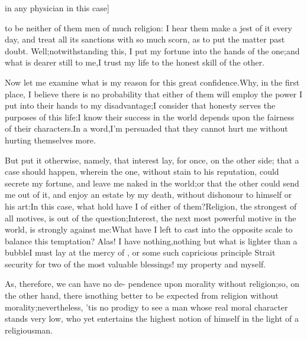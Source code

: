 \documentclass{article}
\begin{document}
\noindent
{}
\stick{“\kern 2pt the physician I usually call in,” [There}
in any physician in this case] 
\begin{story}{to be}
    neither of them men of much
religion: I hear them make a jest of it every day, and treat all
its sanctions with so much scorn, as to put the matter past doubt.
Well;\tsk notwithstanding this, I put my fortune into the hands
of the one;\break\tsk and what is dearer still to me,\pb I trust my life
to the honest skill of the other.
\end{story}
\vspace\parskip
\begin{story}{Now let me examine what is my}
    reason for this great confidence.\tsh\break Why, in the
    first place, I believe there is no probability that either
    of them will employ the power I put into their hands to my
    disadvantage;\tsk I consider that honesty serves the
    purposes of this life:\tsk I know their success in the world
    depends upon the fairness of their characters.\tsh In a
    word,\tsh I’m persuaded that they cannot hurt me without hurting
    themselves more.
\end{story}
\vspace\parskip
\begin{story}{But put it otherwise, namely, that}
    interest lay, for once, on the other side; that a case
    should happen, wherein the one, without stain to his
    reputation,\break
    could secrete my fortune, and leave\pb
    me naked in
    the world;\tsk or that the other could send me out of it,
    and enjoy an estate by my death, without dishonour to
    himself or his art:\tsk In this case, what hold have I of
    either of them?\break\tsk Religion, the strongest of all motives,
    is out of the question;\tsk Interest, the next most powerful
    motive in the world, is strongly against me:\tsh\break What
    have I left to cast into the opposite scale to balance this
    temptation?\tsh\break
    Alas! I have nothing,\tsk nothing but what
    is lighter than a bubble\tsk I must lay at the mercy of
    , or some such capricious principle\tsk
    Strait security for two of the most valuable blessings!\tsk
    my property and myself.
\end{story}
\vspace\parskip
\begin{story}{As, therefore, we can have no de-}
    pendence upon morality without religion;\tsk so, on the
    other hand, there is\pb nothing better to be expected from
    religion without morality;\tsk neverthe\-less, ’tis no prodigy to
    see a man whose real moral character stands very low, who
    yet entertains the highest notion of himself in the light of
    a religious\break man.
\end{story}
\end{document}
